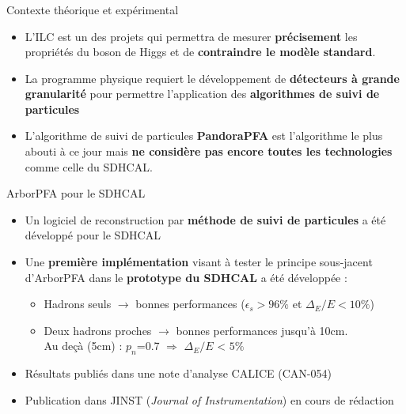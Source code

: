 \documentclass[8pt]{beamer}
\begin{document}
  \begin{frame}
  \frametitle{\secname}
  \framesubtitle{\subsecname}
    \begin{block}{Contexte théorique et expérimental}
      \begin{itemize}
        \pause
        \item L'ILC est un des projets qui permettra de mesurer \textbf{précisement} les propriétés du boson de Higgs et de \textbf{contraindre le modèle standard}.
        \pause
        \item La programme physique requiert le développement de \textbf{détecteurs à grande granularité} pour permettre l'application des \textbf{algorithmes de suivi de particules}
        \pause
        \item L'algorithme de suivi de particules \textbf{PandoraPFA} est l'algorithme le plus abouti à ce jour mais \textbf{ne considère pas encore toutes les technologies} comme celle du SDHCAL.
      \end{itemize}
    \end{block}
    \pause
    \begin{block}{ArborPFA pour le SDHCAL}
      \begin{itemize}
        \pause
        \item Un logiciel de reconstruction par \textbf{méthode de suivi de particules} a été développé pour le SDHCAL
        \pause
        \item Une \textbf{première implémentation} visant à tester le principe sous-jacent d'ArborPFA dans le \textbf{prototype du SDHCAL} a été développée :
        \begin{itemize}
          \item Hadrons seuls $\rightarrow$ bonnes performances ($\epsilon_s > 96\%$ et $\Delta_E/E < 10\%$)
          \item Deux hadrons proches $\rightarrow$ bonnes performances jusqu'à 10cm. \\
          Au deçà (5cm) : $p_n$=0.7 $\Rightarrow$ $\Delta_E/E$ < $5\%$
        \end{itemize}
        \pause
        \item Résultats publiés dans une note d'analyse CALICE (CAN-054)
        \pause
        \item Publication dans JINST (\textit{Journal of Instrumentation}) en cours de rédaction
      \end{itemize}
    \end{block}
  \end{frame}
\end{document}
